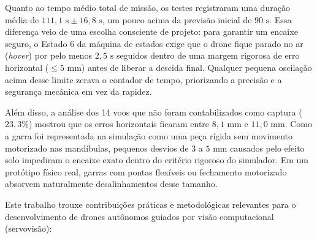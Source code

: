 Quanto ao tempo médio total de missão, os testes registraram uma duração média de $111,1\text{ s} \pm 16,8\text{ s}$, um pouco acima da previsão inicial de $90\text{ s}$. Essa diferença veio de uma escolha consciente de projeto: para garantir um encaixe seguro, o Estado 6 da máquina de estados exige que o drone fique parado no ar (\textit{hover}) por pelo menos $2,5\text{ s}$ seguidos dentro de uma margem rigorosa de erro horizontal ($\le 5\text{ mm}$) antes de liberar a descida final. Qualquer pequena oscilação acima desse limite zerava o contador de tempo, priorizando a precisão e a segurança mecânica em vez da rapidez.

Além disso, a análise dos 14 voos que não foram contabilizados como captura ($23,3\%$) mostrou que os erros horizontais ficaram entre $8,1\text{ mm}$ e $11,0\text{ mm}$. Como a garra foi representada na simulação como uma peça rígida sem movimento motorizado nas mandíbulas, pequenos desvios de $3$ a $5\text{ mm}$ causados pelo efeito solo impediram o encaixe exato dentro do critério rigoroso do simulador. Em um protótipo físico real, garras com pontas flexíveis ou fechamento motorizado absorvem naturalmente desalinhamentos desse tamanho.


Este trabalho trouxe contribuições práticas e metodológicas relevantes para o desenvolvimento de drones autônomos guiados por visão computacional (servovisão):

